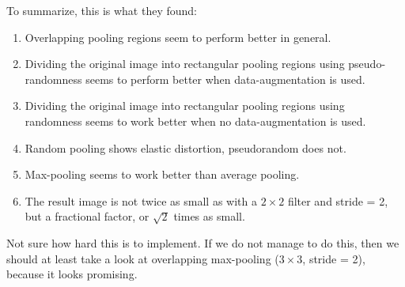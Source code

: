 \documentclass[a4paper, 11pt]{article}
\begin{document}
\noindent To summarize, this is what they found:
\begin{enumerate}[topsep=6pt,itemsep=3pt]
	\item Overlapping pooling regions seem to perform better in general.
	\item Dividing the original image into rectangular pooling regions using pseudo-randomness seems to perform better when data-augmentation is used.
	\item Dividing the original image into rectangular pooling regions using randomness seems to work better when no data-augmentation is used.
	\item Random pooling shows elastic distortion, pseudorandom does not.
	\item Max-pooling seems to work better than average pooling.
	\item The result image is not twice as small as with a $2\times2$ filter and stride = 2, but a fractional factor, or $\sqrt{2}$ times as small.
\end{enumerate}
Not sure how hard this is to implement.
If we do not manage to do this, then we should at least take a look at overlapping max-pooling ($3\times3$, stride = 2), because it looks promising.
\end{document}
